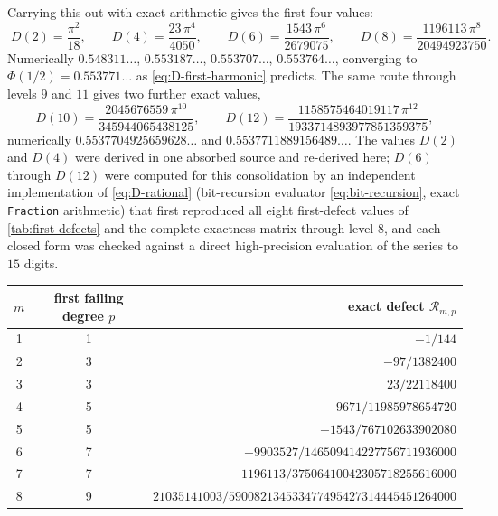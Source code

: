 \documentclass[11pt,oneside]{article}
\numberwithin{equation}{section}
\theoremstyle{definition}
\theoremstyle{remark}
\newcommand{\defect}{\mathcal R}
\begin{document}
Carrying this out with exact arithmetic gives the first four values:
\begin{equation}
 \boxed{\;
 D(2)=\frac{\pi^{2}}{18},
 \qquad
 D(4)=\frac{23\,\pi^{4}}{4050},
 \qquad
 D(6)=\frac{1543\,\pi^{6}}{2679075},
 \qquad
 D(8)=\frac{1196113\,\pi^{8}}{20494923750}.
 \;}
 \label{eq:D-values}
\end{equation}
Numerically $0.548311\ldots$, $0.553187\ldots$, $0.553707\ldots$,
$0.553764\ldots$, converging to $\Phi(1/2)=0.553771\ldots$ as
\eqref{eq:D-first-harmonic} predicts.  The same route through levels
$9$ and $11$ gives two further exact values,
\begin{equation}
 D(10)=\frac{2045676559\,\pi^{10}}{345944065438125},
 \qquad
 D(12)=\frac{1158575464019117\,\pi^{12}}{1933714893977851359375},
 \label{eq:D-values-higher}
\end{equation}
numerically $0.5537704925659628\ldots$ and
$0.5537711889156489\ldots$.  The values $D(2)$ and $D(4)$
were derived in one absorbed source and re-derived here; $D(6)$
through $D(12)$ were computed for this consolidation by an
independent implementation of \eqref{eq:D-rational} (bit-recursion
evaluator \eqref{eq:bit-recursion}, exact \texttt{Fraction}
arithmetic) that first reproduced all eight first-defect values of
\cref{tab:first-defects} and the complete exactness matrix through
level $8$, and each closed form was checked against a direct
high-precision evaluation of the series to $15$ digits.

\begin{center}
\small
\begin{tabular}{c c r}
\toprule
$m$ & first failing degree $p$ & exact defect $\defect_{m,p}$ \\
\midrule
1 & 1 & $-1/144$ \\
2 & 3 & $-97/1382400$ \\
3 & 3 & $23/22118400$ \\
4 & 5 & $9671/11985978654720$ \\
5 & 5 & $-1543/767102633902080$ \\
6 & 7 & $-9903527/146509414227756711936000$ \\
7 & 7 & $1196113/37506410042305718255616000$ \\
8 & 9 & $21035141003/590082134533477495427314445451264000$ \\
\bottomrule
\end{tabular}
\label{tab:first-defects}
\end{center}
\end{document}
